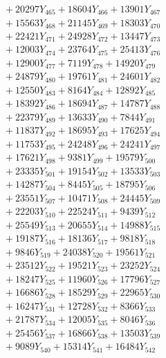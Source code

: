 \documentclass[a4paper,10pt]{article}
\begin{document}
{\begin{align}
&\;  + 20297 Y_{465} + 18604 Y_{466} + 13901 Y_{467} \\[0.3ex]
&\;  + 15563 Y_{468} + 21145 Y_{469} + 18303 Y_{470} \\[0.3ex]
&\;  + 22421 Y_{471} + 24928 Y_{472} + 13447 Y_{473} \\[0.3ex]
&\;  + 12003 Y_{474} + 23764 Y_{475} + 25413 Y_{476} \\[0.3ex]
&\;  + 12900 Y_{477} + 7119 Y_{478} + 14920 Y_{479} \\[0.5ex]\allowbreak
&\;  + 24879 Y_{480} + 19761 Y_{481} + 24601 Y_{482} \\[0.3ex]
&\;  + 12550 Y_{483} + 8164 Y_{484} + 12892 Y_{485} \\[0.3ex]
&\;  + 18392 Y_{486} + 18694 Y_{487} + 14787 Y_{488} \\[0.3ex]
&\;  + 22379 Y_{489} + 13633 Y_{490} + 7844 Y_{491} \\[0.3ex]
&\;  + 11837 Y_{492} + 18695 Y_{493} + 17625 Y_{494} \\[0.3ex]
&\;  + 11753 Y_{495} + 24248 Y_{496} + 24241 Y_{497} \\[0.3ex]
&\;  + 17621 Y_{498} + 9381 Y_{499} + 19579 Y_{500} \\[0.3ex]
&\;  + 23335 Y_{501} + 19154 Y_{502} + 13533 Y_{503} \\[0.3ex]
&\;  + 14287 Y_{504} + 8445 Y_{505} + 18795 Y_{506} \\[0.3ex]
&\;  + 23551 Y_{507} + 10471 Y_{508} + 24445 Y_{509} \\[0.5ex]\allowbreak
&\;  + 22203 Y_{510} + 22524 Y_{511} + 9439 Y_{512} \\[0.3ex]
&\;  + 25549 Y_{513} + 20655 Y_{514} + 14988 Y_{515} \\[0.3ex]
&\;  + 19187 Y_{516} + 18136 Y_{517} + 9818 Y_{518} \\[0.3ex]
&\;  + 9846 Y_{519} + 24038 Y_{520} + 19561 Y_{521} \\[0.3ex]
&\;  + 23512 Y_{522} + 19521 Y_{523} + 23252 Y_{524} \\[0.3ex]
&\;  + 18247 Y_{525} + 11960 Y_{526} + 17796 Y_{527} \\[0.3ex]
&\;  + 16686 Y_{528} + 18529 Y_{529} + 22965 Y_{530} \\[0.3ex]
&\;  + 16247 Y_{531} + 12728 Y_{532} + 8366 Y_{533} \\[0.3ex]
&\;  + 21787 Y_{534} + 12005 Y_{535} + 8046 Y_{536} \\[0.3ex]
&\;  + 25456 Y_{537} + 16866 Y_{538} + 13503 Y_{539} \\[0.5ex]\allowbreak
&\;  + 9089 Y_{540} + 15314 Y_{541} + 16484 Y_{542} \\[0.3ex]

\end{align}}
\end{document}
